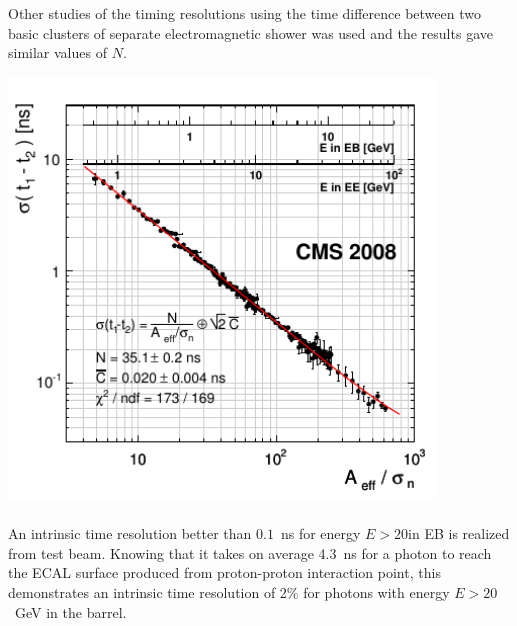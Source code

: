 Other studies of the timing resolutions using the time difference between two basic clusters of separate electromagnetic shower was used and the results gave similar values of $N$.
\begin{center}
\centering
\mbox{\includegraphics[height=0.60\textwidth, width=0.85\textwidth]{THESISPLOTS/ECAL_Timing_Resolution.png}}
\label{fig:FitTimeRes}
\end{center}
\paragraph{} %
An intrinsic time resolution  better than $0.1$~ns for energy $E > 20$\GeV in EB is realized from test beam. Knowing that it takes on average 4.3~ns for a photon to reach the ECAL surface produced from proton-proton interaction point, this demonstrates an intrinsic time resolution of 2\% for photons with energy $E > 20$~GeV in the barrel.%

